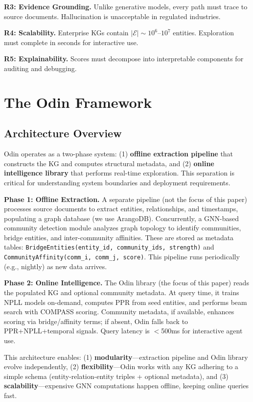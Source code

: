 \documentclass[10pt,twocolumn]{article}
\begin{document}
\textbf{R3: Evidence Grounding.} Unlike generative models, every path must trace to source documents. Hallucination is unacceptable in regulated industries.

\textbf{R4: Scalability.} Enterprise KGs contain $|\mathcal{E}| \sim 10^6$--$10^7$ entities. Exploration must complete in seconds for interactive use.

\textbf{R5: Explainability.} Scores must decompose into interpretable components for auditing and debugging.

\section{The Odin Framework}

\subsection{Architecture Overview}

Odin operates as a two-phase system: (1) \textbf{offline extraction pipeline} that constructs the KG and computes structural metadata, and (2) \textbf{online intelligence library} that performs real-time exploration. This separation is critical for understanding system boundaries and deployment requirements.

\textbf{Phase 1: Offline Extraction.} A separate pipeline (not the focus of this paper) processes source documents to extract entities, relationships, and timestamps, populating a graph database (we use ArangoDB). Concurrently, a GNN-based community detection module analyzes graph topology to identify communities, bridge entities, and inter-community affinities. These are stored as metadata tables: \texttt{BridgeEntities(entity\_id, community\_ids, strength)} and \texttt{CommunityAffinity(comm\_i, comm\_j, score)}. This pipeline runs periodically (e.g., nightly) as new data arrives.

\textbf{Phase 2: Online Intelligence.} The Odin library (the focus of this paper) reads the populated KG and optional community metadata. At query time, it trains NPLL models on-demand, computes PPR from seed entities, and performs beam search with COMPASS scoring. Community metadata, if available, enhances scoring via bridge/affinity terms; if absent, Odin falls back to PPR+NPLL+temporal signals. Query latency is $<$500ms for interactive agent use.

This architecture enables: (1) \textbf{modularity}—extraction pipeline and Odin library evolve independently, (2) \textbf{flexibility}—Odin works with any KG adhering to a simple schema (entity-relation-entity triples + optional metadata), and (3) \textbf{scalability}—expensive GNN computations happen offline, keeping online queries fast.
\end{document}
